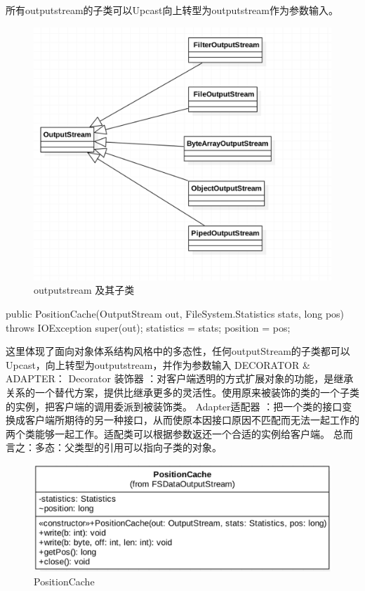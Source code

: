所有outputstream的子类可以Upcast向上转型为outputstream作为参数输入。
\begin{figure}[h]
\centering
\includegraphics[width =1\linewidth]{output.png}
\caption{outputstream 及其子类}
\label{fig:sa:OutputStream}
\end{figure}
\begin{java}
public PositionCache(OutputStream out,
                     FileSystem.Statistics stats,
                     long pos) throws IOException {
  super(out);
  statistics = stats;
  position = pos;
}
\end{java}
这里体现了面向对象体系结构风格中的多态性，任何outputStream的子类都可以Upcast，向上转型为outputstream，并作为参数输入
DECORATOR \& ADAPTER：
Decorator 装饰器 ：对客户端透明的方式扩展对象的功能，是继承关系的一个替代方案，提供比继承更多的灵活性。使用原来被装饰的类的一个子类的实例，把客户端的调用委派到被装饰类。
Adapter适配器 ：把一个类的接口变换成客户端所期待的另一种接口，从而使原本因接口原因不匹配而无法一起工作的两个类能够一起工作。适配类可以根据参数返还一个合适的实例给客户端。
总而言之：多态：父类型的引用可以指向子类的对象。
\begin{figure}[h]
\centering
\includegraphics[width =1\linewidth]{positioncache.png}
\caption{PositionCache}
\label{fig:sa:PositionCache}
\end{figure}
